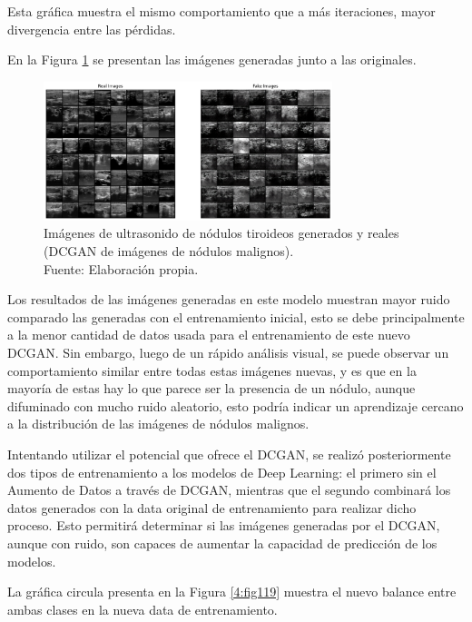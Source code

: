 Esta gráfica muestra el mismo comportamiento que a más iteraciones, mayor divergencia entre las pérdidas.

En la Figura \ref{4:fig118} se presentan las imágenes generadas junto a las originales.

\begin{figure}[H]
	\begin{center}
		\includegraphics[width=0.75\textwidth]{4/figures/generated_real_2.png}
		\caption[Imágenes de ultrasonido de nódulos tiroideos generados y reales (DCGAN de imágenes de nódulos malignos)]{Imágenes de ultrasonido de nódulos tiroideos generados y reales (DCGAN de imágenes de nódulos malignos). \\
		Fuente: Elaboración propia.}
		\label{4:fig118}
	\end{center}
\end{figure}

Los resultados de las imágenes generadas en este modelo muestran mayor ruido comparado las generadas con el entrenamiento inicial, esto se debe principalmente a la menor cantidad de datos usada para el entrenamiento de este nuevo DCGAN. Sin embargo, luego de un rápido análisis visual, se puede observar un comportamiento similar entre todas estas imágenes nuevas, y es que en la mayoría de estas hay lo que parece ser la presencia de un nódulo, aunque difuminado con mucho ruido aleatorio, esto podría indicar un aprendizaje cercano a la distribución de las imágenes de nódulos malignos.

Intentando utilizar el potencial que ofrece el DCGAN, se realizó posteriormente dos tipos de entrenamiento a los modelos de Deep Learning: el primero sin el Aumento de Datos a través de DCGAN, mientras que el segundo combinará los datos generados con la data original de entrenamiento para realizar dicho proceso. Esto permitirá determinar si las imágenes generadas por el DCGAN, aunque con ruido, son capaces de aumentar la capacidad de predicción de los modelos.

La gráfica circula presenta en la Figura \ref{4:fig119} muestra el nuevo balance entre ambas clases en la nueva data de entrenamiento.

